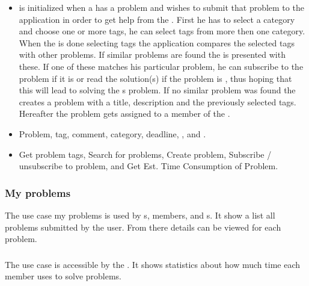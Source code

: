 \begin{itemize}
\item {} \ucsproblem[c] is initialized when a \aclient{} has a problem and wishes to submit that problem to the application in order to get help from the \astaff{}. 
First he has to select a category and choose one or more tags, he can select tags from more then one category. 
When the \aclient{} is done selecting tags the application compares the selected tags with other problems. 
If similar problems are found the \aclient{} is presented with these.
If one of these matches his particular problem, he can subscribe to the problem if it is \open[] or read the solution(s) if the problem is \closed{}, thus hoping that this will lead to solving the \aclient[]s problem.
If no similar problem was found the \aclient{} creates a problem with a title, description and the previously selected tags. 
Hereafter the problem gets assigned to a member of the \astaff{}. 

\item {} Problem, tag, comment, category, deadline, \client[], and \staff[].

\item {} Get problem tags, Search for problems, Create problem, Subscribe / unsubscribe to problem, and Get Est. Time Consumption of Problem. 
\end{itemize}



\subsubsection{My problems} The use case my problems is used by  \aclient[]s, \astaff[] members, and \admin[]s. It show a list all problems submitted by the user. From there details can be viewed for each problem. 


\subsubsection{\gstat[c]} The use case \gstat[] is accessible by the \admin[]. It shows statistics about how much time each \astaff[] member uses to solve problems.

